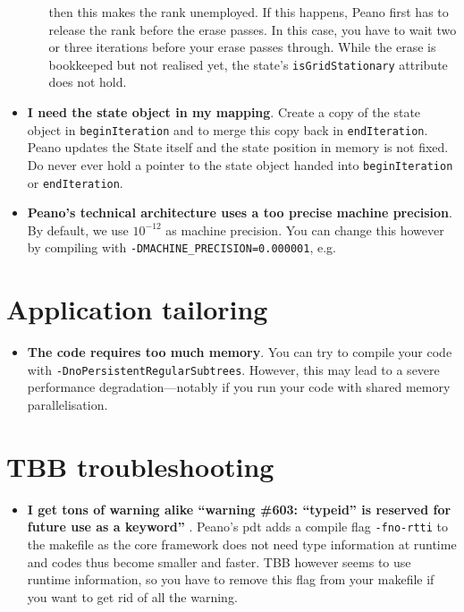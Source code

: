 \begin{itemize}
\begin{itemize}
    then this makes the rank unemployed. If this happens, Peano first has to
    release the rank before the erase passes. In this case, you have to wait two
    or three iterations before your erase passes through. While the erase is
    bookkeeped but not realised yet, the state's \texttt{isGridStationary}
    attribute does not hold.
  \end{itemize}
  \item \textbf{ I need the state object in my mapping}. Create a copy of the
  state object in \texttt{beginIteration} and to merge this copy back in \texttt{endIteration}. 
  Peano updates the State itself and the state position in memory is not fixed.
  Do never ever hold a pointer to the state object handed into
  \texttt{beginIteration} or \texttt{endIteration}.
  \item \textbf{Peano's technical architecture uses a too precise machine
  precision}. By default, we use $10^{-12}$ as machine precision. You can change
  this however by compiling with \linebreak
  \texttt{-DMACHINE\_PRECISION=0.000001}, e.g.
\end{itemize}


\section{Application tailoring}

\begin{itemize}
  \item \textbf{ The code requires too much memory}.
  You can try to compile your code with
  \linebreak \texttt{-DnoPersistentRegularSubtrees}.
  However, this may lead to a severe performance \linebreak
  degradation---notably if you run your code with shared memory parallelisation.
\end{itemize}

\section{TBB troubleshooting}

\begin{itemize}
  \item \textbf{ I get tons of warning alike ``warning \#603: ``typeid'' is reserved for future use as a keyword'' }.
  Peano's pdt adds a compile flag \texttt{-fno-rtti} to the makefile as the core framework does 
  not need type information at runtime and codes thus become smaller and faster. TBB however 
  seems to use runtime information, so you have to remove this flag from your makefile if you 
  want to get rid of all the warning. 
\end{itemize}

